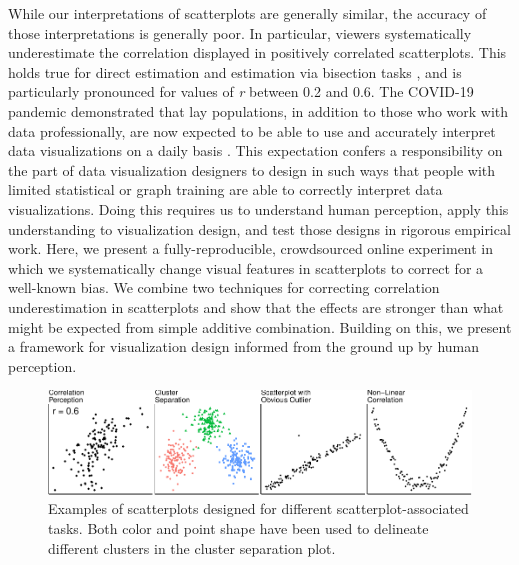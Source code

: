 \documentclass[sigconf]{acmart}
\begin{document}
While our interpretations of scatterplots are generally similar, the
accuracy of those interpretations is generally poor. In particular,
viewers systematically underestimate the correlation displayed in
positively correlated scatterplots. This holds true for direct
estimation
\citep{strahan_1978, bobko_1979, cleveland_1982, lane_1985, lauer_1989, collyer_1990, meyer_1992}
and estimation via bisection tasks \citep{rensink_2017}, and is
particularly pronounced for values of \emph{r} between 0.2 and 0.6. The
COVID-19 pandemic demonstrated that lay populations, in addition to
those who work with data professionally, are now expected to be able to
use and accurately interpret data visualizations on a daily basis
\citep{bbc_2022}. This expectation confers a responsibility on the part
of data visualization designers to design in such ways that people with
limited statistical or graph training are able to correctly interpret
data visualizations. Doing this requires us to understand human
perception, apply this understanding to visualization design, and test
those designs in rigorous empirical work. Here, we present a
fully-reproducible, crowdsourced online experiment in which we
systematically change visual features in scatterplots to correct for a
well-known bias. We combine two techniques for correcting correlation
underestimation in scatterplots and show that the effects are stronger
than what might be expected from simple additive combination. Building
on this, we present a framework for visualization design informed from
the ground up by human perception.

\begin{figure}

{\centering \includegraphics[width=1\textwidth,height=\textheight]{size_and_opacity_files/figure-pdf/fig-tasks-1.pdf}

}

\caption{\label{fig-tasks}Examples of scatterplots designed for
different scatterplot-associated tasks. Both color and point shape have
been used to delineate different clusters in the cluster separation
plot.}

\end{figure}
\end{document}
